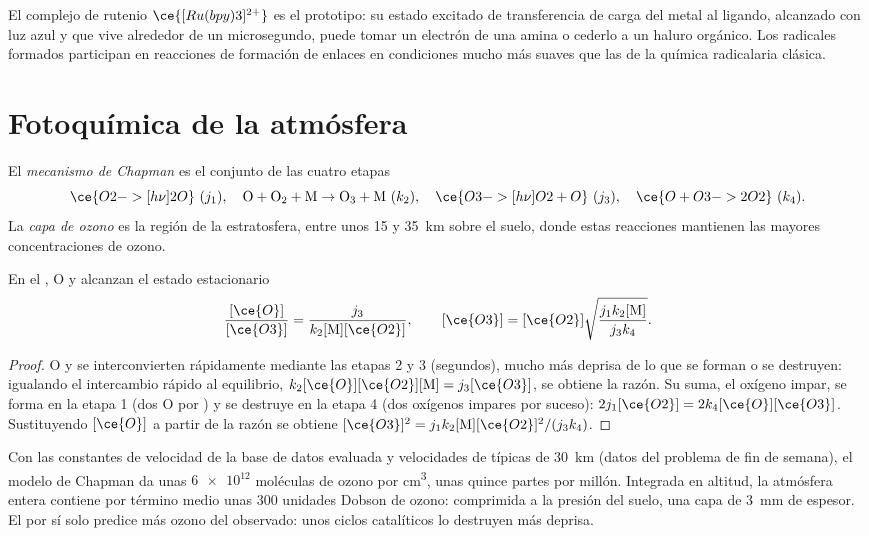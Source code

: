 El complejo de rutenio $\ce{[Ru(bpy)3]^{2+}}$ es el prototipo: su estado excitado de transferencia de
carga del metal al ligando, alcanzado con luz azul y que vive alrededor de un
microsegundo, puede tomar un electrón de una amina o cederlo a un haluro
orgánico. Los radicales formados participan en reacciones de formación de enlaces en
condiciones mucho más suaves que las de la química radicalaria clásica.

\section{Fotoquímica de la atmósfera}

\begin{definition}\label{def:b3:photochemistry:chapman}
El \emph{mecanismo de Chapman} es el conjunto de las cuatro etapas
\[
  \ce{O2 ->[h\nu] 2 O}\ (j_1), \quad \mathrm{O + O_2 + M \to O_3 + M}\ (k_2), \quad
  \ce{O3 ->[h\nu] O2 + O}\ (j_3), \quad \ce{O + O3 -> 2 O2}\ (k_4).
\]
La \emph{capa de ozono} es la región de la estratosfera, entre unos
15 y \qty{35}{km} sobre el suelo, donde estas reacciones mantienen las mayores
concentraciones de ozono.
\end{definition}

\begin{theorem}\label{thm:b3:photochemistry:chapman}
En el , O y  alcanzan el estado estacionario
\[
  \frac{[\ce{O}]}{[\ce{O3}]} = \frac{j_3}{k_2[\mathrm M][\ce{O2}]}, \qquad
  [\ce{O3}] = [\ce{O2}]\sqrt{\frac{j_1k_2[\mathrm M]}{j_3k_4}} .
\]
\end{theorem}

\begin{proof}
O y  se interconvierten rápidamente mediante las etapas 2 y 3 (segundos), mucho más deprisa
de lo que se forman o se destruyen: igualando el intercambio rápido al equilibrio,
$k_2[\ce{O}][\ce{O2}][\mathrm M] = j_3[\ce{O3}]$, se obtiene la razón. Su suma, el oxígeno impar, se forma en la
etapa 1 (dos O por ) y se destruye en la etapa 4 (dos oxígenos impares por suceso):
$2j_1[\ce{O2}] = 2k_4[\ce{O}][\ce{O3}]$. Sustituyendo $[\ce{O}]$ a partir de la razón se obtiene $[\ce{O3}]^2 = j_1k_2[\mathrm M][\ce{O2}]^2/(j_3k_4)$.
\end{proof}

Con las constantes de velocidad de la base de datos evaluada y velocidades de  típicas
de \qty{30}{km} (datos del problema de fin de semana), el modelo de Chapman da unas
$\num{6e12}$ moléculas de ozono por \unit{cm^3}, unas quince partes por millón. Integrada en
altitud, la atmósfera entera contiene por término medio unas 300 unidades Dobson de ozono:
comprimida a la presión del suelo, una capa de \qty{3}{mm} de espesor. El 
por sí solo predice más ozono del observado: unos ciclos catalíticos lo destruyen más deprisa.

